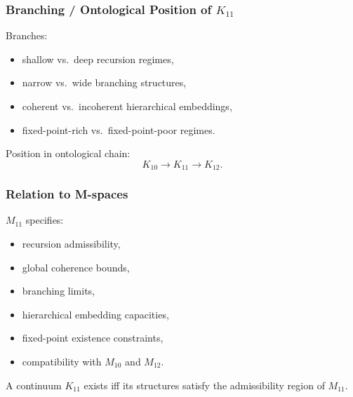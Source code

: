 \subsubsection{Branching / Ontological Position of $K_{11}$}

Branches:
\begin{itemize}
    \item shallow vs.\ deep recursion regimes,
    \item narrow vs.\ wide branching structures,
    \item coherent vs.\ incoherent hierarchical embeddings,
    \item fixed-point-rich vs.\ fixed-point-poor regimes.
\end{itemize}

Position in ontological chain:
\[
K_{10} \to K_{11} \to K_{12}.
\]

\subsubsection{Relation to M-spaces}

$M_{11}$ specifies:
\begin{itemize}
    \item recursion admissibility,
    \item global coherence bounds,
    \item branching limits,
    \item hierarchical embedding capacities,
    \item fixed-point existence constraints,
    \item compatibility with $M_{10}$ and $M_{12}$.
\end{itemize}

A continuum $K_{11}$ exists iff its structures satisfy the admissibility region of $M_{11}$.
